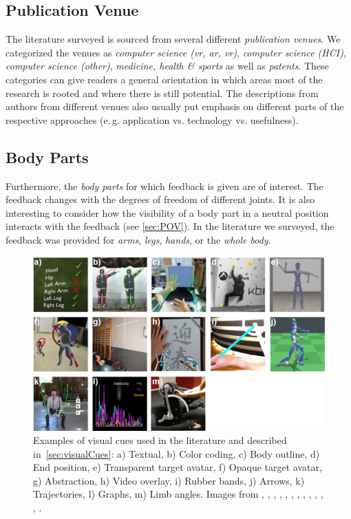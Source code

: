 \subsection*{Publication Venue}
The literature surveyed is sourced from several different \emph{publication venues}. We categorized the venues as \emph{computer science (\acrshort{vr}, \acrshort{ar}, \acrshort{vr})}, \textit{computer science (HCI)}, \emph{computer science (other)}, \emph{medicine, health \& sports} as well as \emph{patents}. These categories can give readers a general orientation in which areas most of the research is rooted and where there is still potential. The descriptions from authors from different venues also usually put emphasis on different parts of the respective approaches (e.\,g. application vs. technology vs. usefulness).

\subsection*{Body Parts}
Furthermore, the \textit{body parts} for which feedback is given are of interest. The feedback changes with the degrees of freedom of different joints. It is also interesting to consider how the visibility of a body part in a neutral position interacts with the feedback (see \autoref{sec:POV}). In the literature we surveyed, the feedback was provided for \textit{arms}, \textit{legs}, \textit{hands}, or the \textit{whole body}.

\begin{figure}[tb]
    \centering
    \includegraphics[width=1\linewidth]{pictures/CueMatrix.PNG}
    \caption[Examples of visual cues used in the literature.]{Examples of visual cues used in the literature and described in~\autoref{sec:visualCues}: a) Textual, b) Color coding, c) Body outline, d) End position, e) Transparent target avatar, f) Opaque target avatar, g) Abstraction, h) Video overlay, i) Rubber bands, j) Arrows, k) Trajectories, l) Graphs, m) Limb angles.  Images from \cite{caserman2021fbm}, \cite{quevedo2017asr}, \cite{han2016ara}, \cite{wiehr2016bce}, \cite{waltemate2016tlp}, \cite{ikeda2018arb}, \cite{vidal2020blo}, \cite{furukawa2018dar}, \cite{yu2020pmd}, \cite{oshita2018sts}, \cite{clarke2020rva}, \cite{takahashi2019vrb}, \cite{debarba2018arv}. \label{fig:CueMatrix}}
\end{figure}

